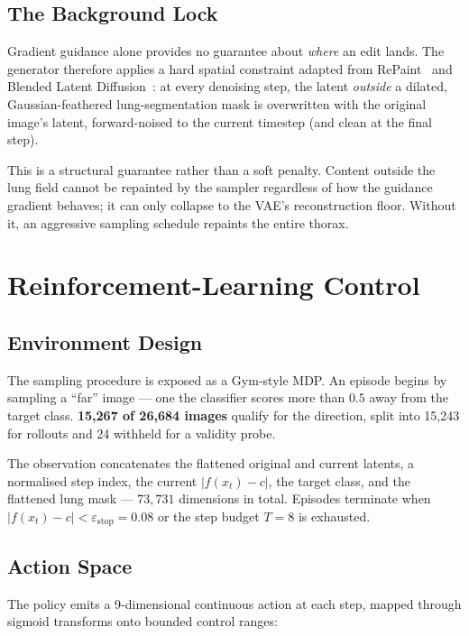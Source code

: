 \subsection{The Background Lock}

Gradient guidance alone provides no guarantee about \emph{where} an edit
lands. The generator therefore applies a hard spatial constraint adapted
from RePaint~\cite{lugmayr2022repaint} and Blended Latent
Diffusion~\cite{avrahami2022blended}: at every denoising step, the latent
\emph{outside} a dilated, Gaussian-feathered lung-segmentation mask is
overwritten with the original image's latent, forward-noised to the
current timestep (and clean at the final step).

This is a structural guarantee rather than a soft penalty. Content
outside the lung field cannot be repainted by the sampler regardless of
how the guidance gradient behaves; it can only collapse to the VAE's
reconstruction floor. Without it, an aggressive sampling schedule
repaints the entire thorax.

\section{Reinforcement-Learning Control}

\subsection{Environment Design}

The sampling procedure is exposed as a Gym-style MDP. An episode begins
by sampling a ``far'' image --- one the classifier scores more than
$0.5$ away from the target class. \textbf{15{,}267 of 26{,}684 images}
qualify for the \ntop{} direction, split into 15{,}243 for rollouts and
24 withheld for a validity probe.

The observation concatenates the flattened original and current latents,
a normalised step index, the current $|f(x_t) - c|$, the target class,
and the flattened lung mask --- $73{,}731$ dimensions in total. Episodes
terminate when $|f(x_t) - c| < \varepsilon_{\text{stop}} = 0.08$ or the
step budget $T = 8$ is exhausted.

\subsection{Action Space}

The policy emits a 9-dimensional continuous action at each step, mapped
through sigmoid transforms onto bounded control ranges:

